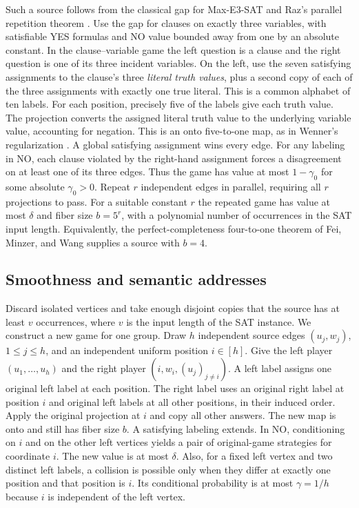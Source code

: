 \documentclass[11pt]{article}
\begin{document}
Such a source follows from the classical gap for
Max-E3-SAT \cite[Theorem~6.5]{Hastad} and Raz's parallel repetition theorem \cite{Raz}.
Use the gap for clauses on exactly three variables, with satisfiable YES
formulas and NO value bounded away from one by an absolute constant.
In the clause--variable game the left question is
a clause and the right question is one of its three incident variables.
On the left, use the seven satisfying assignments to the clause's three
\emph{literal truth values}, plus a second copy of each of the three
assignments with exactly one true literal. This is a common alphabet of
ten labels. For each position, precisely five of the labels give each
truth value. The projection converts the assigned literal truth value
to the underlying variable value, accounting for negation. This is an
onto five-to-one map, as in Wenner's regularization \cite[proof of
Theorem~1.17]{Wenner}. A global satisfying assignment wins every edge.
For any labeling in NO, each clause violated by the right-hand assignment
forces a disagreement on at least one of its three edges. Thus the
game has value at most $1-\gamma_0$ for some absolute $\gamma_0>0$.
Repeat $r$ independent edges in parallel, requiring all $r$ projections
to pass. For a suitable constant $r$ the repeated game has value at
most $\delta$ and fiber size $b=5^r$, with a polynomial number of
occurrences in the SAT input length. Equivalently, the perfect-completeness
four-to-one theorem of Fei, Minzer, and Wang \cite[Theorem~1.6]{FMW}
supplies a source with $b=4$.

\subsection{Smoothness and semantic addresses}

Discard isolated vertices and take enough disjoint copies that the
source has at least $v$ occurrences, where $v$ is the input length
of the SAT instance. We construct a new game for one group.
Draw $h$ independent source edges $(u_j,w_j)$, $1\le j\le h$, and an
independent uniform position $i\in[h]$. Give the left player
$(u_1,\ldots,u_h)$ and the right player $(i,w_i,(u_j)_{j\ne i})$.
A left label assigns one original left label at each position. The right
label uses an original right label at position $i$ and original left
labels at all other positions, in their induced order. Apply the original
projection at $i$ and copy all other answers. The new map is onto
and still has fiber size $b$. A satisfying labeling extends. In NO,
conditioning on $i$ and on the other left vertices yields a pair of
original-game strategies for coordinate $i$. The new value is at
most $\delta$. Also, for a fixed left vertex and two distinct left
labels, a collision is possible only when they differ at exactly
one position and that position is $i$. Its conditional probability
is at most $\gamma=1/h$ because $i$ is independent of the left vertex.
\end{document}

